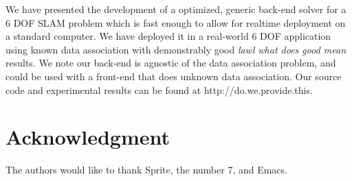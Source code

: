 \documentclass[conference]{IEEEtran}
\begin{document}
We have presented the development of a optimized, generic back-end solver for a 6 DOF SLAM
problem which is fast enough to allow for realtime deployment on a standard computer.  We
have deployed it in a real-world 6 DOF application using known data association with
demonstrably good \emph{ lawl what does good mean} results.  We note our back-end is agnostic of the data
association problem, and could be used with a front-end that does unknown data
association.  Our source code and experimental results can be found at
http://do.we.provide.this.


\section{Acknowledgment}

The authors would like to thank Sprite, the number 7, and Emacs.





\end{document}
